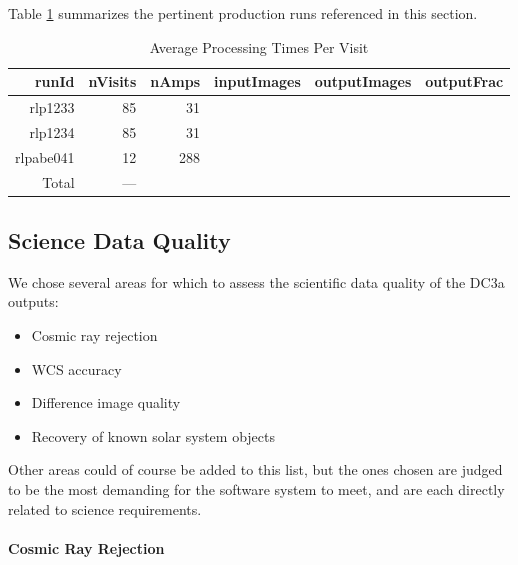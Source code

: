 Table \ref{tbl:runsummary} summarizes the pertinent production runs
referenced in this section.

\begin{table}[htbp]
\centering
\caption{Average Processing Times Per Visit
\label{tbl:runsummary}}
\vspace{\baselineskip}
\begin{tabular}{ | r | r | r | r | r | r |}
\hline\hline
runId & nVisits & nAmps & inputImages & outputImages & outputFrac \\ \hline
rlp1233 & 85  & 31 &  &  &  \\ \hline
rlp1234 & 85  & 31 &  &  &  \\ \hline
rlpabe041 & 12  & 288 &  &  &  \\ \hline
Total   & --- &    &  &  &  \\ \hline
\end{tabular}
\end{table}

\subsection{Science Data Quality}
We chose several areas for which to assess the scientific data quality of the DC3a outputs:
\begin{itemize}
\item Cosmic ray rejection
\item WCS accuracy
\item Difference image quality
\item Recovery of known solar system objects
\end{itemize}
Other areas could of course be added to this list, but the ones chosen
are judged to be the most demanding for the software system to meet,
and are each directly related to science requirements. 
\paragraph{Cosmic Ray Rejection}
